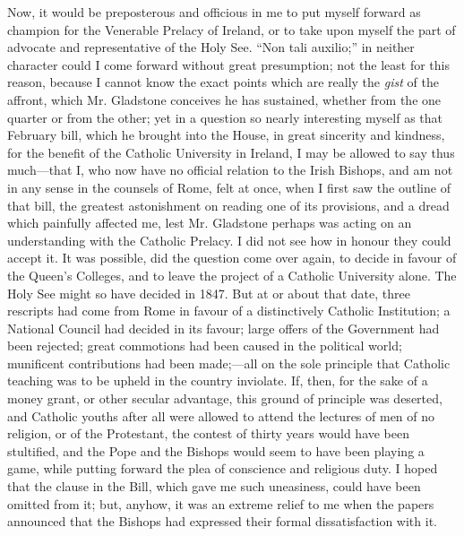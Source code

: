 Now, it would be preposterous and officious in me to put myself
forward as champion for the Venerable Prelacy of Ireland, or to take
upon myself the part of advocate and representative of the Holy See.
``Non tali auxilio;'' in neither character could I come forward
without great presumption; not the least for this reason, because I
cannot know the exact points which are really the \emph{gist} of the
affront, which Mr. Gladstone conceives he has sustained, whether from
the one quarter or from the other; yet in a question so nearly
interesting myself as that February bill, which he brought into the
House, in great sincerity and kindness, for the benefit of the Catholic
University in Ireland, I may be allowed to say thus much—that I, who
now have no official relation to the Irish Bishops, and am not in any
sense in the counsels of Rome, felt at once, when I first saw the
outline of that bill, the greatest astonishment on reading one of its
provisions, and a dread which painfully affected me, lest Mr. Gladstone
perhaps was acting on an understanding with the Catholic Prelacy. I did
not see how in honour they could accept it. It was possible, did the
question come over again, to decide in favour of the Queen's Colleges,
and to leave the project of a Catholic University alone. The Holy See
might so have decided in 1847. But at or about that date, three
rescripts had come from Rome in favour of a distinctively Catholic
Institution; a National Council had decided in its favour; large offers
of the Government had been rejected; great commotions had been caused in
the political world; munificent contributions had been made;—all
on the sole principle that Catholic teaching was to be upheld in the
country inviolate. If, then, for the sake of a money grant, or other
secular advantage, this ground of principle was deserted, and Catholic
youths after all were allowed to attend the lectures of men of no
religion, or of the Protestant, the contest of thirty years would have
been stultified, and the Pope and the Bishops would seem to have been
playing a game, while putting forward the plea of conscience and
religious duty. I hoped that the clause in the Bill, which gave me such
uneasiness, could have been omitted from it; but, anyhow, it was an
extreme relief to me when the papers announced that the Bishops had
expressed their formal dissatisfaction with it.

